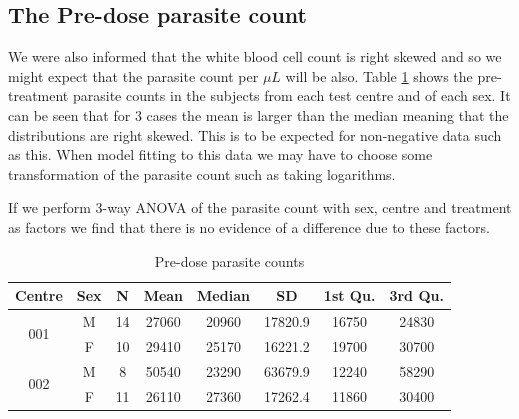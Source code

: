 \subsection{The Pre-dose parasite count}
We were also informed that the white blood cell count is right skewed and so we might expect that the parasite count per $\mu L$ will be also. Table \ref{predose} shows the pre-treatment parasite counts in the subjects from each test centre and of each sex. It can be seen that for 3 cases the mean is larger than the median meaning that the distributions are right skewed. This is to be expected for non-negative data such as this. When model fitting to this data we may have to choose some transformation of the parasite count such as taking logarithms.

If we perform 3-way ANOVA of the parasite count with sex, centre and treatment as factors we find that there is no evidence of a difference due to these factors.
\begin{table}[h]
\centering
\caption{Pre-dose parasite counts}\label{predose}
\begin{tabular}{|cc|cccccc|}
\hline
Centre&Sex&N&Mean&Median&SD&1st Qu.&3rd Qu.\\\hline
\multirow{2}{*}{001}&M&14&27060&20960&17820.9&16750&24830\\
&F&10&29410&25170&16221.2&19700&30700\\\hline
\multirow{3}{*}{002}&M&8&50540&23290&63679.9&12240&58290\\
&F&11&26110&27360&17262.4&11860&30400\\\hline
\end{tabular}
\end{table}
